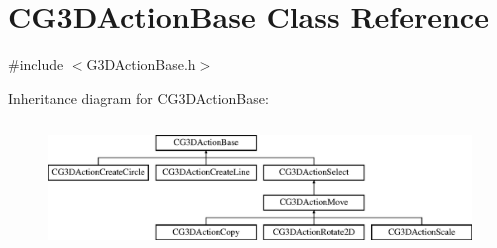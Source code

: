 \hypertarget{class_c_g3_d_action_base}{}\section{C\+G3\+D\+Action\+Base Class Reference}
\label{class_c_g3_d_action_base}


{\ttfamily \#include $<$G3\+D\+Action\+Base.\+h$>$}

Inheritance diagram for C\+G3\+D\+Action\+Base\+:\begin{figure}[H]
\begin{center}
\leavevmode
\includegraphics[height=3.456790cm]{class_c_g3_d_action_base}
\end{center}
\end{figure}
